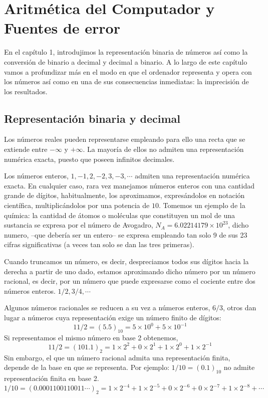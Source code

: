 \chapter{Aritmética del Computador y Fuentes de error}
En el capítulo 1, introdujimos la representación binaria de números así como la conversión de binario a decimal y decimal a binario. A lo largo de este capítulo vamos a profundizar más en el modo en que el ordenador representa y opera con los números así como en una de sus consecuencias inmediatas: la imprecisión de los resultados. 

\section{Representación binaria y decimal}

Los números reales pueden representarse empleando para ello una recta que se extiende entre $-\infty$ y $+\infty$. La mayoría de ellos no admiten una representación numérica exacta, puesto que poseen infinitos decimales. 

Los números enteros, $1, -1, 2, -2, 3, -3, \cdots$ admiten una representación numérica exacta.  En cualquier caso, rara vez manejamos números enteros con una cantidad grande de dígitos, habitualmente, los aproximamos, expresándolos en notación científica, multiplicándolos por una potencia de $10$. Tomemos un ejemplo de la química: la cantidad de átomos o moléculas que constituyen un mol de una sustancia se expresa por el número de Avogadro, $N_A=6.02214179 \times 10^{23}$, dicho numero, --que debería ser un entero--  se expresa empleando tan solo 9 de sus 23 cifras significativas (a veces tan solo se dan las tres primeras). 

 Cuando truncamos un número, es decir, despreciamos todos sus dígitos hacia la derecha a partir de uno dado, estamos aproximando dicho número por un  número racional, es decir, por un número que puede expresarse como el cociente entre dos números enteros. $1/2, 3/4, \cdots$ 

Algunos números racionales se reducen a su vez a números enteros, $6/3$, otros dan lugar a números cuya representación exige un número finito de dígitos: 
\begin{equation*}
11/2=(5.5)_{10}=5\times10^0+5\times10^{-1}
\end{equation*} 
Si representamos el mismo número en base 2 obtenemos,
\begin{equation*}
11/2=(101.1)_2=1\times2^2+0\times2^1+1\times2^0+1\times2^{-1}
\end{equation*}
Sin embargo, el que un número racional admita una representación finita, depende de la base en que se representa. Por ejemplo: $1/10=(0.1)_{10}$ no admite representación finita en base 2.
\begin{equation*}
1/10=(0.0001100110011\cdots)_2 =1\times2^{-4}+1\times2^{-5}+0\times2^{-6}+0\times2^{-7}+1\times2^{-8}+\cdots 
\end{equation*}
 
